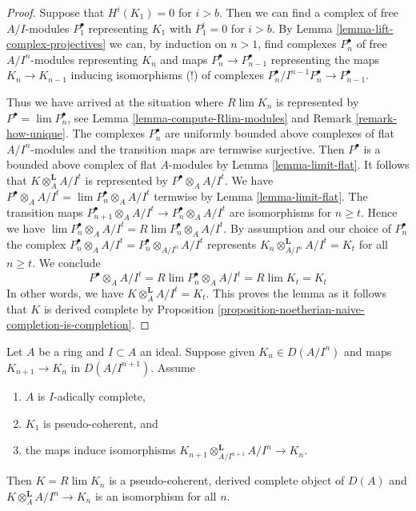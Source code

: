 \begin{proof}
Suppose that $H^i(K_1) = 0$ for $i > b$. Then we can find a complex of
free $A/I$-modules $P_1^\bullet$ representing $K_1$ with $P_1^i = 0$
for $i > b$. By Lemma \ref{lemma-lift-complex-projectives}
we can, by induction on $n > 1$, find
complexes $P_n^\bullet$ of free $A/I^n$-modules representing $K_n$
and maps $P_n^\bullet \to P_{n - 1}^\bullet$ representing the maps
$K_n \to K_{n - 1}$ inducing isomorphisms (!)
of complexes $P_n^\bullet/I^{n - 1}P_n^\bullet \to P_{n - 1}^\bullet$.

\medskip\noindent
Thus we have arrived at the situation where $R\lim K_n$ is represented by
$P^\bullet = \lim P_n^\bullet$, see
Lemma \ref{lemma-compute-Rlim-modules} and
Remark \ref{remark-how-unique}.
The complexes $P_n^\bullet$ are uniformly bounded above complexes
of flat $A/I^n$-modules and the transition maps are termwise surjective.
Then $P^\bullet$ is a bounded above complex of flat $A$-modules by
Lemma \ref{lemma-limit-flat}.
It follows that $K \otimes_A^\mathbf{L} A/I^t$ is represented by
$P^\bullet \otimes_A A/I^t$. We have
$P^\bullet \otimes_A A/I^t = \lim P_n^\bullet \otimes_A A/I^t$
termwise by Lemma \ref{lemma-limit-flat}.
The transition maps
$P_{n + 1}^\bullet \otimes_A A/I^t \to P_n^\bullet \otimes_A A/I^t$
are isomorphisms for $n \geq t$. Hence we have
$\lim P_n^\bullet \otimes_A A/I^t = R\lim P_n^\bullet \otimes_A A/I^t$.
By assumption and our choice of $P_n^\bullet$ the complex
$P_n^\bullet \otimes_A A/I^t = P_n^\bullet \otimes_{A/I^n} A/I^t$
represents $K_n \otimes_{A/I^n}^\mathbf{L} A/I^t = K_t$ for all $n \geq t$.
We conclude
$$
P^\bullet \otimes_A A/I^t =
R\lim P_n^\bullet \otimes_A A/I^t =
R\lim K_t = K_t
$$
In other words, we have $K \otimes_A^\mathbf{L} A/I^t = K_t$.
This proves the lemma as it follows that $K$ is derived complete by
Proposition \ref{proposition-noetherian-naive-completion-is-completion}.
\end{proof}

\begin{lemma}
\label{lemma-Rlim-pseudo-coherent-gives-complete-pseudo-coherent}
Let $A$ be a ring and $I \subset A$ an ideal.
Suppose given $K_n \in D(A/I^n)$ and maps $K_{n + 1} \to K_n$
in $D(A/I^{n + 1})$. Assume
\begin{enumerate}
\item $A$ is $I$-adically complete,
\item $K_1$ is pseudo-coherent, and
\item the maps induce isomorphisms
$K_{n + 1} \otimes_{A/I^{n + 1}}^\mathbf{L} A/I^n \to K_n$.
\end{enumerate}
Then $K = R\lim K_n$ is a pseudo-coherent, derived complete object of $D(A)$
and $K \otimes_A^\mathbf{L} A/I^n \to K_n$ is an isomorphism for all $n$.
\end{lemma}

